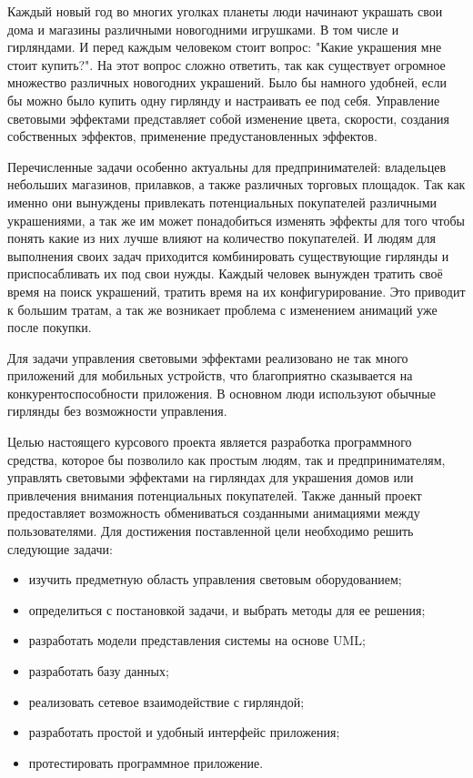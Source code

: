 \label{sec:introduction}

Каждый новый год во многих уголках планеты люди начинают украшать свои дома и магазины различными новогодними игрушками. В том числе и гирляндами. И перед каждым человеком стоит вопрос: "Какие украшения мне стоит купить?". На этот вопрос сложно ответить, так как существует огромное множество различных новогодних украшений. Было бы намного удобней, если бы можно было купить одну гирлянду и настраивать ее под себя. Управление световыми эффектами представляет собой изменение цвета, скорости, создания собственных эффектов, применение предустановленных эффектов.

Перечисленные задачи особенно актуальны для предпринимателей: владельцев небольших магазинов, прилавков, а также различных торговых площадок. Так как именно они вынуждены привлекать потенциальных покупателей различными украшениями, а так же им может понадобиться изменять эффекты для того чтобы понять какие из них лучше влияют на количество покупателей. И людям для выполнения своих задач приходится комбинировать существующие гирлянды и приспосабливать их под свои нужды. Каждый человек вынужден тратить своё время на поиск украшений, тратить время на их конфигурирование. Это приводит к большим тратам, а так же возникает проблема с изменением анимаций уже после покупки.

Для задачи управления световыми эффектами реализовано не так много приложений для мобильных устройств, что благоприятно сказывается на конкурентоспособности приложения. В основном люди используют обычные гирлянды без возможности управления.

Целью настоящего курсового проекта является разработка программного средства, которое бы позволило как простым людям, так и предпринимателям, управлять световыми эффектами на гирляндах для украшения домов или привлечения внимания потенциальных покупателей. Также данный проект предоставляет возможность обмениваться созданными анимациями между пользователями. Для достижения поставленной цели необходимо решить следующие задачи:
\begin{itemize}
\item изучить предметную область управления световым оборудованием;
\item определиться с постановкой задачи, и выбрать методы для ее решения;
\item разработать модели представления системы на основе UML;
\item разработать базу данных;
\item реализовать сетевое взаимодействие с гирляндой;
\item разработать простой и удобный интерфейс приложения;
\item протестировать программное приложение.
\end{itemize}